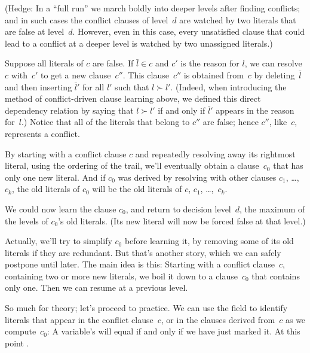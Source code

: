 (Hedge: In a ``full run'' we march boldly into deeper levels after
finding conflicts; and in such cases the conflict clauses of level~$d$
are watched by two literals that are false at level~$d$. However,
even in this case, every unsatisfied clause that could lead to a
conflict at a deeper level is watched by two unassigned literals.)

Suppose all literals of $c$ are false. If $\bar l\in c$ and $c'$ is the
reason for $l$, we can resolve $c$ with~$c'$ to get a new clause~$c''$.
This clause~$c''$ is obtained from~$c$ by deleting~$\bar l$ and
then inserting $\bar l'$ for all $l'$ such that $l\succ l'$. (Indeed,
when introducing the method of conflict-driven clause learning above,
we defined this direct dependency relation by saying that $l\succ l'$ if and
only if $\bar l'$ appears in the reason for~$l$.)
Notice that all of the literals that belong to $c''$ are false;
hence $c''$, like~$c$, represents a conflict.

By starting with a conflict clause $c$ and repeatedly
resolving away its rightmost literal, using the ordering of the trail,
we'll eventually obtain
a clause~$c_0$ that has only one new literal. And if $c_0$ was derived by
resolving with other clauses $c_1$, \dots,~$c_k$, the old literals of $c_0$
will be the old literals of $c$, $c_1$, \dots,~$c_k$.

We could now learn the clause $c_0$, and return to decision level~$d$,
the maximum of the levels of $c_0$'s old literals. (Its new literal
will now be forced false at that level.)

Actually, we'll try to simplify $c_0$ before learning it,
by removing some of its old literals if they are redundant. But that's
another story, which we can safely postpone until later. The main idea
is this: Starting with a conflict clause~$c$, containing two or more new
literals, we boil it down to a clause~$c_0$ that contains only one.
Then we can resume at a previous level.

\fi

So much for theory; let's proceed to practice. We can use the 
field to identify literals that appear in the conflict clause~$c$, or in the
clauses derived from~$c$ as we compute~$c_0$: A variable's  will
equal  if and only if we have just marked it.
At this point .

